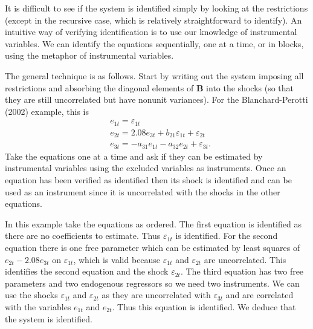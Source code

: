 \documentclass[10pt]{article}
\begin{document}
It is difficult to see if the system is identified simply by looking at the restrictions (except in the recursive case, which is relatively straightforward to identify). An intuitive way of verifying identification is to use our knowledge of instrumental variables. We can identify the equations sequentially, one at a time, or in blocks, using the metaphor of instrumental variables.

The general technique is as follows. Start by writing out the system imposing all restrictions and absorbing the diagonal elements of $\boldsymbol{B}$ into the shocks (so that they are still uncorrelated but have nonunit variances). For the Blanchard-Perotti (2002) example, this is
$$
\begin{aligned}
&e_{1 t}=\varepsilon_{1 t} \\
&e_{2 t}=2.08 e_{3 t}+b_{21} \varepsilon_{1 t}+\varepsilon_{2 t} \\
&e_{3 t}=-a_{31} e_{1 t}-a_{32} e_{2 t}+\varepsilon_{3 t} .
\end{aligned}
$$
Take the equations one at a time and ask if they can be estimated by instrumental variables using the excluded variables as instruments. Once an equation has been verified as identified then its shock is identified and can be used as an instrument since it is uncorrelated with the shocks in the other equations.

In this example take the equations as ordered. The first equation is identified as there are no coefficients to estimate. Thus $\varepsilon_{1 t}$ is identified. For the second equation there is one free parameter which can be estimated by least squares of $e_{2 t}-2.08 e_{3 t}$ on $\varepsilon_{1 t}$, which is valid because $\varepsilon_{1 t}$ and $\varepsilon_{2 t}$ are uncorrelated. This identifies the second equation and the shock $\varepsilon_{2 t}$. The third equation has two free parameters and two endogenous regressors so we need two instruments. We can use the shocks $\varepsilon_{1 t}$ and $\varepsilon_{2 t}$ as they are uncorrelated with $\varepsilon_{3 t}$ and are correlated with the variables $e_{1 t}$ and $e_{2 t}$. Thus this equation is identified. We deduce that the system is identified.
\end{document}
